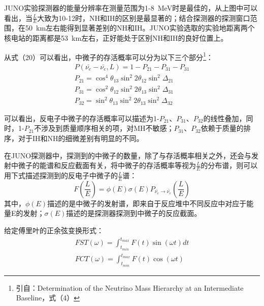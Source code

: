 \documentclass[10pt,a4paper]{article}
\begin{document}
JUNO实验探测器的能量分辨率在测量范围为1-\SI{8}{MeV}时是最佳的，从上图中可以看出，当$\frac{L}{E}$大致为10-12时，NH和IH的区别是最显著的；结合探测器的探测窗口范围，在\SI{50}{km}左右能得到显著差别的NH和IH。JUNO实验选取的实验地距离两个核电站的距离都是\SI{53}{km}左右，正好能处于区别NH和IH的良好位置上。

从式（20）可以看出，中微子的存活概率可以分为以下三个部分\footnote{引自：Determination of the Neutrino Mass Hierarchy at an Intermediate Baseline，式（4）}：
 \begin{equation}
 \begin{split}
P(\bar{\nu_e}-\bar{\nu_e},L)=1-P_{21}-P_{31}-P_{31}\\
P_{21}=\cos^4{\theta_{13}}\sin^2{2\theta_{12}}\sin^2{\Delta_{21}}\\
P_{31}=\cos^2{\theta_{12}}\sin^2{2\theta_{13}}\sin^2{\Delta_{31}}\\
P_{32}=\sin^2\theta_{13}\sin^2{2\theta_{13}}\sin^2{\Delta_{32}} 
 \end{split}
 \end{equation}

可以看出，反电子中微子的存活概率可以描述为1-$P_{21}$、$P_{31}$、$P_{32}$的线性叠加，同时，1-$P_{21}$不涉及到质量顺序相关的项，对MH不敏感；$P_{31}$、$P_{32}$依赖于质量的排序，对于IH和NH的细微差别有明显的不同。

在JUNO探测器中，探测到的中微子的数量，除了与存活概率相关之外，还会与发射中微子的能谱和反应截面有关，将中微子的存活概率等视为$\frac{L}{E}$的分布谱，则可以用下式描述探测到的反电子中微子的$\frac{L}{E}$谱：
\begin{equation}
F(\frac{L}{E})=\phi(E)\sigma(E)P_{\bar{\nu_e}\rightarrow\bar{\nu_e}}(\frac{L}{E})
\end{equation}
其中，$\phi(E)$描述的是中微子的发射谱，即来自于反应堆中不同反应中对应于能量E的发射；$\sigma(E)$描述的是探测器探测到中微子的反应截面。

给定傅里叶的正余弦变换形式：
\begin{equation}
\begin{split}
FST(\omega)=\int_{t_{min}}^{t_{max}}F(t)\sin(\omega t)dt\\
FCT(\omega)=\int_{t_{min}}^{t_{max}}F(t)\cos(\omega t)
\end{split}
\end{equation}
\end{document}
